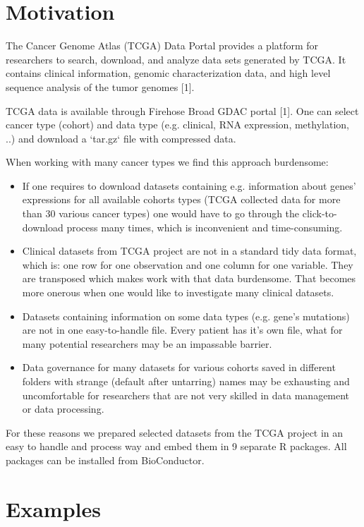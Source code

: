 \documentclass{bioinfo}
\begin{document}
\section*{Motivation}
The Cancer Genome Atlas (TCGA) Data Portal provides a platform for researchers to search, download, and analyze data sets generated by TCGA. It contains clinical information, genomic characterization data, and high level sequence analysis of the tumor genomes [1]. 

TCGA data is available through Firehose Broad GDAC portal [1]. One can select cancer type (cohort) and data type (e.g. clinical, RNA expression, methylation, ..) and download a `tar.gz` file with compressed data. 

When working with many cancer types we find this approach burdensome:

\begin{itemize}
\item If one requires to download datasets containing e.g. information about genes' expressions for all available cohorts types (TCGA collected data for more than 30 various cancer types) one would have to go through the click-to-download process many times, which is inconvenient and time-consuming.
\item Clinical datasets from TCGA project are not in a standard tidy data format, which is: one row for one observation and one column for one variable. They are transposed which makes work with that data burdensome. That becomes more onerous when one would like to investigate
many clinical datasets.
\item Datasets containing information on some data types (e.g. gene's mutations) are not in one easy-to-handle file. Every patient has it's own file, what for many potential researchers may be an impassable barrier. 
\item Data governance for many datasets for various cohorts saved in different folders with strange (default after untarring) names may be exhausting and uncomfortable for researchers that are not very skilled in data management or data processing.
\end{itemize}
For these reasons we prepared selected datasets from the TCGA project in an easy to handle and process way and embed them in 9 separate R packages. All packages can be installed from BioConductor.
\section*{Examples}
\end{document}

